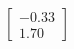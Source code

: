 \documentclass[preview]{standalone}
\begin{document}
\begin{align*}
\begin{bmatrix} -0.33 \\ 1.70 \end{bmatrix}
\end{align*}
\end{document}
